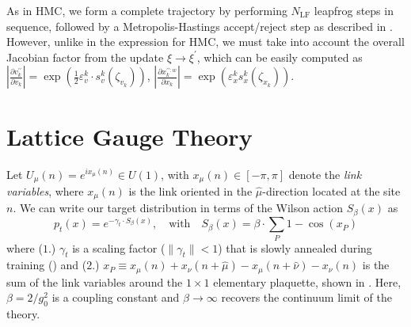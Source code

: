 \documentclass{article} %
\begin{document}
As in HMC, we form a complete trajectory by performing \(N_{\mathrm{LF}}\) leapfrog steps in sequence, followed by a Metropolis-Hastings accept/reject step as described in .
%
However, unlike in the expression for HMC, we must take into account the overall Jacobian factor from the update
\(\xi\rightarrow\xi^{\prime}\), which can be easily computed as \(\left|\tfrac{\partial v^{\prime\prime}_{k}}{\partial
   v_{k}}\right| = \exp{\left(\tfrac{1}{2}{\varepsilon^{k}_{v}\cdot s^{k}_{v}(\zeta_{v_{k}})}\right)}\),
   \(\left|\tfrac{\partial x^{\prime\prime:w
   }_{k}}{\partial x_{k}}\right| = \exp{\left(\varepsilon^{k}_{x}
   s^{k}_{x}(\zeta_{x_{k}})\right)}\).
%
%
%
\section{\label{sec:lattice_gauge_theory}Lattice Gauge Theory}
%
Let \(U_{\mu}(n) = e^{i x_{\mu}(n)} \in U(1)\), with \(x_{\mu}(n) \in [-\pi,\pi]\) denote the \emph{link
variables}, where \(x_{\mu}(n)\) is the link oriented in the \(\hat{\mu}\)-direction located at the site
\(n\).
%
%
%
%
%
We can write our target distribution in terms of the Wilson action \(S_{\beta}(x)\) as
%
\begin{equation}
   p_{t}(x) = e^{-\gamma_{t}\cdot S_{\beta}(x)},\quad\text{with}\quad S_{\beta}(x) = \beta\cdot \sum_{P}1 - \cos(x_{P})
   \label{eq:wilsonaction}
\end{equation}
%
where (\(1\).) \(\gamma_{t}\) is a scaling factor (\(\|\gamma_{t}\|<1\)) that is slowly annealed during training () and (\(2\).) \(x_{P} \equiv x_{\mu}(n) + x_{\nu}(n+\hat{\mu}) - x_{\mu}(n+\hat{\nu}) -x_{\nu}(n)\) is the sum of the link
variables around the \(1\times1\) elementary plaquette, shown in .
%
Here, \(\beta = 2 / g_{0}^{2}\) is a coupling constant and \(\beta\rightarrow\infty\) recovers the continuum limit of the theory. 
%
\end{document}

